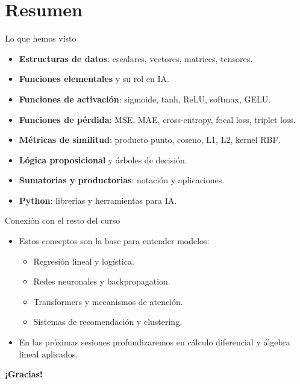 \documentclass[aspectratio=169, 10pt, xcolor=table]{beamer}
\begin{document}
\section{Resumen}

\begin{frame}{Lo que hemos visto}
    \begin{itemize}
        \item \textbf{Estructuras de datos}: escalares, vectores, matrices, tensores.
        \item \textbf{Funciones elementales} y su rol en IA.
        \item \textbf{Funciones de activación}: sigmoide, tanh, ReLU, softmax, GELU.
        \item \textbf{Funciones de pérdida}: MSE, MAE, cross-entropy, focal loss, triplet loss.
        \item \textbf{Métricas de similitud}: producto punto, coseno, L1, L2, kernel RBF.
        \item \textbf{Lógica proposicional} y árboles de decisión.
        \item \textbf{Sumatorias y productorias}: notación y aplicaciones.
        \item \textbf{Python}: librerías y herramientas para IA.
    \end{itemize}
\end{frame}

\begin{frame}{Conexión con el resto del curso}
    \begin{itemize}
        \item Estos conceptos son la base para entender modelos:
        \begin{itemize}
            \item Regresión lineal y logística.
            \item Redes neuronales y backpropagation.
            \item Transformers y mecanismos de atención.
            \item Sistemas de recomendación y clustering.
        \end{itemize}
        \item En las próximas sesiones profundizaremos en cálculo diferencial y álgebra lineal aplicados.
    \end{itemize}
\end{frame}

\begin{frame}
    \centering
    \Huge \textbf{¡Gracias!}

\end{frame}
\end{document}
